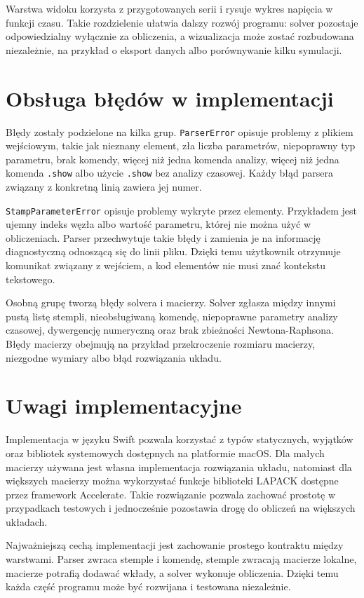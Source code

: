 Warstwa widoku korzysta z przygotowanych serii i rysuje wykres napięcia w funkcji czasu. Takie rozdzielenie ułatwia dalszy rozwój programu: solver pozostaje odpowiedzialny wyłącznie za obliczenia, a wizualizacja może zostać rozbudowana niezależnie, na przykład o eksport danych albo porównywanie kilku symulacji.

\section{Obsługa błędów w implementacji}
\label{sec:implementacja-bledy}

Błędy zostały podzielone na kilka grup. \texttt{ParserError} opisuje problemy z plikiem wejściowym, takie jak nieznany element, zła liczba parametrów, niepoprawny typ parametru, brak komendy, więcej niż jedna komenda analizy, więcej niż jedna komenda \texttt{.show} albo użycie \texttt{.show} bez analizy czasowej. Każdy błąd parsera związany z konkretną linią zawiera jej numer.

\texttt{StampParameterError} opisuje problemy wykryte przez elementy. Przykładem jest ujemny indeks węzła albo wartość parametru, której nie można użyć w obliczeniach. Parser przechwytuje takie błędy i zamienia je na informację diagnostyczną odnoszącą się do linii pliku. Dzięki temu użytkownik otrzymuje komunikat związany z wejściem, a kod elementów nie musi znać kontekstu tekstowego.

Osobną grupę tworzą błędy solvera i macierzy. Solver zgłasza między innymi pustą listę stempli, nieobsługiwaną komendę, niepoprawne parametry analizy czasowej, dywergencję numeryczną oraz brak zbieżności Newtona-Raphsona. Błędy macierzy obejmują na przykład przekroczenie rozmiaru macierzy, niezgodne wymiary albo błąd rozwiązania układu.

\section{Uwagi implementacyjne}
\label{sec:uwagi-implementacyjne}

Implementacja w języku Swift pozwala korzystać z typów statycznych, wyjątków oraz bibliotek systemowych dostępnych na platformie macOS. Dla małych macierzy używana jest własna implementacja rozwiązania układu, natomiast dla większych macierzy można wykorzystać funkcje biblioteki LAPACK dostępne przez framework Accelerate. Takie rozwiązanie pozwala zachować prostotę w przypadkach testowych i jednocześnie pozostawia drogę do obliczeń na większych układach.

Najważniejszą cechą implementacji jest zachowanie prostego kontraktu między warstwami. Parser zwraca stemple i komendę, stemple zwracają macierze lokalne, macierze potrafią dodawać wkłady, a solver wykonuje obliczenia. Dzięki temu każda część programu może być rozwijana i testowana niezależnie.
